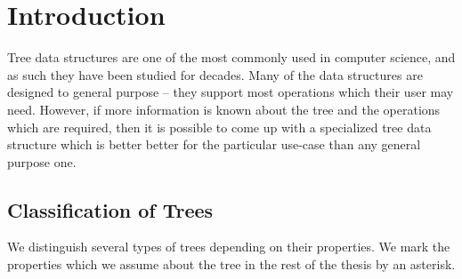 \chapter*{Introduction}

Tree data structures are one of the most commonly used in computer science, and as such they have been studied for decades.
Many of the data structures are designed to general purpose -- they support most operations which their user may need.
However, if more information is known about the tree and the operations which are required, then it is possible to come up with a specialized tree data structure which is better better for the particular use-case than any general purpose one.

\section*{Classification of Trees}

We distinguish several types of trees depending on their properties.
We mark the properties which we assume about the tree in the rest of the thesis by an asterisk.

